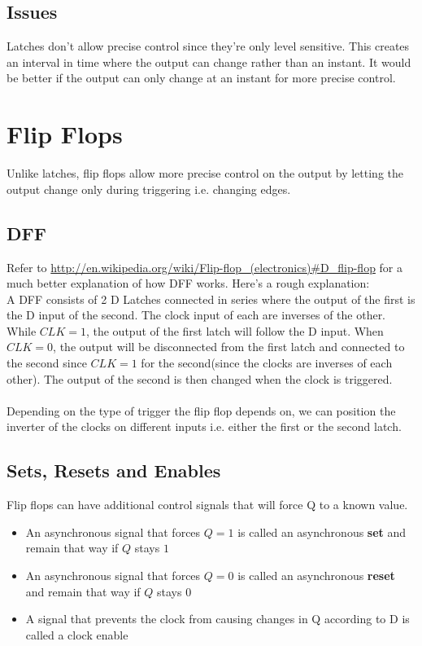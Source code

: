 \documentclass[12pt]{report}
\begin{document}
		\subsection{Issues}Latches don't allow precise control since they're only level sensitive. This creates an interval in time where the output can change rather than an instant. It would be better if the output can only change at an instant for more precise control.
	\section{Flip Flops}
		Unlike latches, flip flops allow more precise control on the output by letting the output change only during triggering i.e. changing edges.
		\subsection{DFF}
			Refer to \url{http://en.wikipedia.org/wiki/Flip-flop_(electronics)#D_flip-flop} for a much better explanation of how DFF works.
			Here's a rough explanation:\\
			A DFF consists of 2 D Latches connected in series where the output of the first is the D input of the second. The clock input of each are inverses of the other.\\
			While $CLK = 1$, the output of the first latch will follow the D input. When $CLK = 0$, the output will be disconnected from the first latch and connected to the second since $CLK = 1$ for the second(since the clocks are inverses of each other). The output of the second is then changed when the clock is triggered.\\
			\\
			Depending on the type of trigger the flip flop depends on, we can position the inverter of the clocks on different inputs i.e. either the first or the second latch.
		\subsection{Sets, Resets and Enables}
			Flip flops can have additional control signals that will force Q to a known value.
			\begin{itemize}
				\item An asynchronous signal that forces $Q = 1$ is called an asynchronous \textbf{set} and remain that way if $Q$ stays $1$
				\item An asynchronous signal that forces $Q = 0$ is called an asynchronous \textbf{reset} and remain that way if $Q$ stays $0$
				\item A signal that prevents the clock from causing changes in Q according to D is called a clock enable
			\end{itemize}
\end{document}
